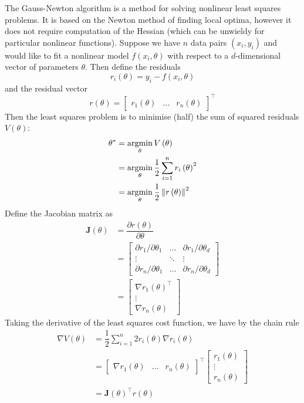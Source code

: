\documentclass[11pt]{report} %
\begin{document}
The Gauss-Newton algorithm is a method for solving nonlinear least squares problems. It is based on the Newton method of finding local optima, however it does not require computation of the Hessian (which can be unwieldy for particular nonlinear functions). Suppose we have $n$ data pairs $\left(x_{i}, y_{i}\right)$ and would like to fit a nonlinear model $f\left(x_{i}, \theta\right)$ with respect to a $d$-dimensional vector of parameters $\theta$. Then define the residuals
\begin{equation}
r_{i}\left(\theta\right) = y_{i} - f\left(x_{i}, \theta\right)
\end{equation}
and the residual vector
\begin{equation}
r\left(\theta\right) = \begin{bmatrix} r_{1}\left(\theta\right) & \dots & r_{n}\left(\theta\right) \end{bmatrix}^{\top}
\end{equation}
Then the least squares problem is to minimise (half) the sum of squared residuals $V\left(\theta\right)$:
\begin{align}
\theta^{*} &= \operatorname*{argmin}_{\theta}V\left(\theta\right) \\
&= \operatorname*{argmin}_{\theta}\dfrac{1}{2}\sum_{i = 1}^{n}r_{i}\left(\theta\right)^{2} \\
&= \operatorname*{argmin}_{\theta}\dfrac{1}{2}\left\Vert r\left(\theta\right)\right\Vert^{2}
\end{align}
Define the Jacobian matrix as
\begin{align}
\mathbf{J}\left(\theta\right) &= \dfrac{\partial r\left(\theta\right)}{\partial \theta} \\
&= \begin{bmatrix}\partial r_{1}/\partial\theta_{1} & \dots & \partial r_{1}/\partial\theta_{d}\\
\vdots & \ddots & \vdots\\
\partial r_{n}/\partial\theta_{1} & \dots & \partial r_{n}/\partial\theta_{d}
\end{bmatrix} \\
&= \begin{bmatrix}
\nabla r_{1}\left(\theta\right)^{\top} \\ \vdots \\ \nabla r_{n}\left(\theta\right)
\end{bmatrix}
\end{align}
Taking the derivative of the least squares cost function, we have by the chain rule
\begin{align}
\nabla V\left(\theta\right) &= \dfrac{1}{2}\sum_{i = 1}^{n}2r_{i}\left(\theta\right)\nabla r_{i}\left(\theta\right) \\
&= \begin{bmatrix} \nabla r_{1}\left(\theta\right) & \dots & r_{n}\left(\theta\right)\end{bmatrix}^{\top} \begin{bmatrix} r_{1}\left(\theta\right) \\ \vdots \\ r_{n}\left(\theta\right) \end{bmatrix} \\
&= \mathbf{J}\left(\theta\right)^{\top}r\left(\theta\right)
\end{align}
\end{document}
